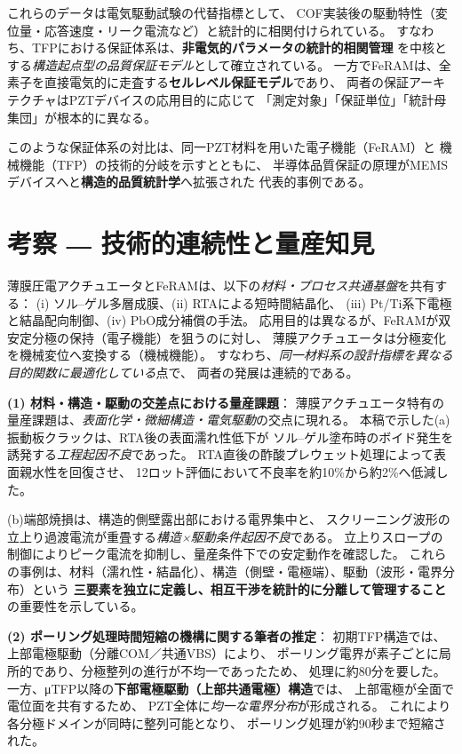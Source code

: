 \documentclass[conference]{IEEEtran}
\begin{document}
これらのデータは電気駆動試験の代替指標として、
COF実装後の駆動特性（変位量・応答速度・リーク電流など）と統計的に相関付けられている。
すなわち、TFPにおける保証体系は、\textbf{非電気的パラメータの統計的相関管理}
を中核とする\emph{構造起点型の品質保証モデル}として確立されている。
一方でFeRAMは、全素子を直接電気的に走査する\textbf{セルレベル保証モデル}であり、
両者の保証アーキテクチャはPZTデバイスの応用目的に応じて
「測定対象」「保証単位」「統計母集団」が根本的に異なる。

\medskip
このような保証体系の対比は、同一PZT材料を用いた電子機能（FeRAM）と
機械機能（TFP）の技術的分岐を示すとともに、
半導体品質保証の原理がMEMSデバイスへと\textbf{構造的品質統計学}へ拡張された
代表的事例である。

\section{考察 ― 技術的連続性と量産知見}
薄膜圧電アクチュエータとFeRAMは、以下の\emph{材料・プロセス共通基盤}を共有する：
(i) ソル–ゲル多層成膜、(ii) RTAによる短時間結晶化、
(iii) Pt/Ti系下電極と結晶配向制御、(iv) PbO成分補償の手法\cite{bottaro1993solgel,scott2000review,damjanovic2010ferro}。
応用目的は異なるが、FeRAMが双安定分極の保持（電子機能）を狙うのに対し、
薄膜アクチュエータは分極変化を機械変位へ変換する（機械機能）。
すなわち、\emph{同一材料系の設計指標を異なる目的関数に最適化している}点で、
両者の発展は連続的である。

\medskip
\noindent
\textbf{(1) 材料・構造・駆動の交差点における量産課題}：
薄膜アクチュエータ特有の量産課題は、\emph{表面化学・微細構造・電気駆動}の交点に現れる。
本稿で示した(a)振動板クラックは、RTA後の表面濡れ性低下が
ソル–ゲル塗布時のボイド発生を誘発する\emph{工程起因不良}であった。
RTA直後の酢酸プレウェット処理によって表面親水性を回復させ、
12ロット評価において不良率を約10\%から約2\%へ低減した。

(b)端部焼損は、構造的側壁露出部における電界集中と、
スクリーニング波形の立上り過渡電流が重畳する\emph{構造×駆動条件起因不良}である。
立上りスロープの制御によりピーク電流を抑制し、量産条件下での安定動作を確認した。
これらの事例は、材料（濡れ性・結晶化）、構造（側壁・電極端）、駆動（波形・電界分布）という
\textbf{三要素を独立に定義し、相互干渉を統計的に分離して管理すること}の重要性を示している。

\medskip
\noindent
\textbf{(2) ポーリング処理時間短縮の機構に関する筆者の推定}：
初期TFP構造では、上部電極駆動（分離COM／共通VBS）により、
ポーリング電界が素子ごとに局所的であり、分極整列の進行が不均一であったため、
処理に約80分を要した。
一方、μTFP以降の\textbf{下部電極駆動（上部共通電極）構造}では、
上部電極が全面で電位面を共有するため、
PZT全体に\emph{均一な電界分布}が形成される。
これにより各分極ドメインが同時に整列可能となり、
ポーリング処理が約90秒まで短縮された。
\end{document}
